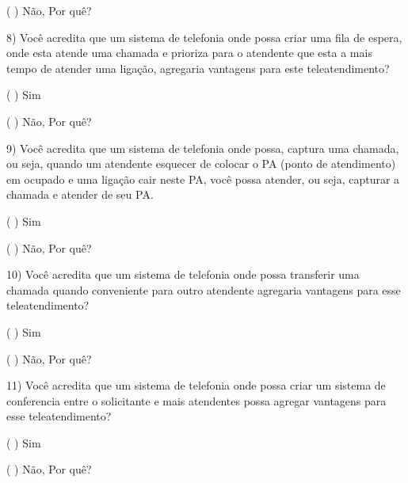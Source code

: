 \documentclass[12pt,openright,oneside,a4paper,brazil]{abntex2}
\begin{document}
\begin{anexosenv}
( ) Não, Por quê?\hrulefill

8) Você acredita que um sistema de telefonia onde possa criar uma fila de espera, onde esta atende uma chamada e prioriza para o atendente que esta a mais tempo de atender uma ligação, agregaria vantagens para este teleatendimento?

( ) Sim

( ) Não, Por quê?\hrulefill

9) Você acredita que um sistema de telefonia onde possa, captura uma chamada, ou seja, quando um atendente esquecer de colocar o PA (ponto de atendimento) em ocupado e uma ligação cair neste PA, você possa atender, ou seja, capturar a chamada e atender de seu PA.

( ) Sim

( ) Não, Por quê?\hrulefill

10) Você acredita que um sistema de telefonia onde possa transferir uma chamada quando conveniente para outro atendente agregaria vantagens para esse teleatendimento?

( ) Sim

( ) Não, Por quê?\hrulefill

11) Você acredita que um sistema de telefonia onde possa criar um sistema de conferencia entre
o solicitante e mais atendentes possa agregar vantagens para esse teleatendimento?

( ) Sim

( ) Não, Por quê?\hrulefill

\end{anexosenv}


\printindex

\end{document}
